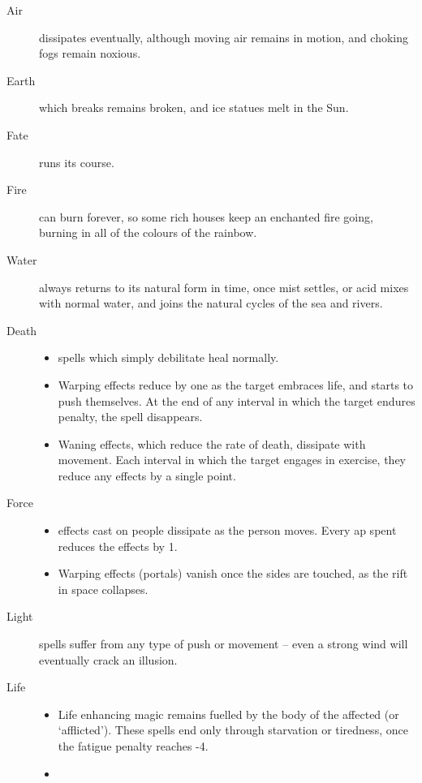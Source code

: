 \begin{multicols}{2}
\begin{description}
  \item[Air]
  dissipates eventually, although moving air remains in motion, and choking fogs remain noxious.
  \item[Earth]
  which breaks remains broken, and ice statues melt in the Sun.
  \item[Fate]
  runs its course.
  \item[Fire]
  can burn forever, so some rich houses keep an enchanted fire going, burning in all of the colours of the rainbow.
  \item[Water]
  always returns to its natural form in time, once mist settles, or acid mixes with normal water, and joins the natural cycles of the sea and rivers.
  \item[Death]
  \begin{itemize}
    \item
    spells which simply debilitate heal normally.
    \item
    Warping effects reduce by one as the target embraces life, and starts to push themselves.
    At the end of any \gls{interval} in which the target endures  penalty, the spell disappears.
    \item
    Waning effects, which reduce the rate of death, dissipate with movement.
    Each \gls{interval} in which the target engages in exercise, they reduce any effects by a single point.
    \label{deathDuration}
  \end{itemize}
  \item[Force]
  \begin{itemize}
    \item
    effects cast on people dissipate as the person moves.
    Every \gls{ap} spent reduces the effects by 1.
    \item
    Warping effects (portals) vanish once the sides are touched, as the rift in space collapses.
  \end{itemize}
  \item[Light]
  spells suffer from any type of push or movement -- even a strong wind will eventually crack an illusion.
  \item[Life]
  \begin{itemize}
    \item
    Life enhancing magic remains fuelled by the body of the affected (or `afflicted').
    These spells end only through starvation or tiredness, once the \gls{fatigue} penalty reaches -4.
    \item

\end{itemize}
\end{description}
\end{multicols}
